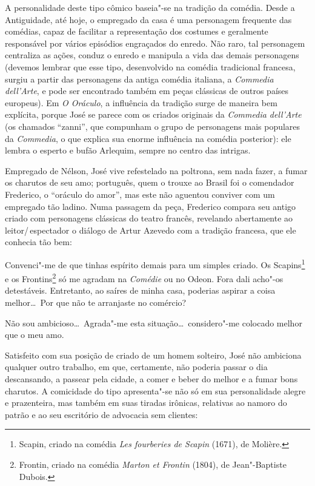 A personalidade deste tipo cômico baseia"-se na tradição da comédia.
Desde a Antiguidade, até hoje, o empregado da casa é uma personagem
frequente das comédias, capaz de facilitar a representação dos costumes
e geralmente responsável por vários episódios engraçados do enredo. Não
raro, tal personagem centraliza as ações, conduz o enredo e manipula a
vida das demais personagens (devemos lembrar que esse tipo,
desenvolvido na comédia tradicional francesa, surgiu a partir das
personagens da antiga comédia italiana, a \textit{Commedia dell’Arte},
e pode ser encontrado também em peças clássicas de outros países
europeus). Em \textit{O Oráculo}, a influência da tradição surge de
maneira bem explícita, porque José se parece com os criados originais
da \textit{Commedia dell’Arte} (os chamados “zanni”, que compunham o
grupo de personagens mais populares da \textit{Commedia}, o que explica
sua enorme influência na comédia posterior): ele lembra o esperto e
bufão Arlequim, sempre no centro das intrigas.

Empregado de Nélson, José vive refestelado na poltrona, sem nada fazer,
a fumar os charutos de seu amo; português, quem o trouxe ao Brasil foi
o comendador Frederico, o “oráculo do amor”, mas este não aguentou
conviver com um empregado tão ladino. Numa passagem da peça, Frederico
compara seu antigo criado com personagens clássicas do teatro francês,
revelando abertamente ao leitor/\,espectador o diálogo de Artur Azevedo
com a tradição francesa, que ele conhecia tão bem:

\begin{hedraquote} 
 Convenci"-me de que tinhas espírito demais para um simples
criado. Os Scapins\footnote{ Scapin, criado na comédia \textit{Les
fourberies de Scapin} (1671), de Molière.}  e os Frontins\footnote{
Frontin, criado na comédia \textit{Marton et Frontin} (1804), de
Jean"-Baptiste Dubois.} só me agradam na \textit{Comédie} ou no Odeon.
Fora dali acho"-os detestáveis. Entretanto, ao saíres de minha casa,
poderias aspirar a coisa melhor\ldots\ Por que não te arranjaste no
comércio?

 Não sou ambicioso\ldots\ Agrada"-me esta situação\ldots\ considero"-me
colocado melhor que o meu amo.
\end{hedraquote} 

Satisfeito com sua posição de criado de um homem solteiro, José não
ambiciona qualquer outro trabalho, em que, certamente, não poderia
passar o dia descansando, a passear pela cidade, a comer e beber do
melhor e a fumar bons charutos. A comicidade do tipo apresenta"-se não
só em sua personalidade alegre e prazenteira, mas também em suas
tiradas irônicas, relativas ao namoro do patrão e ao seu escritório de
advocacia sem clientes: 

